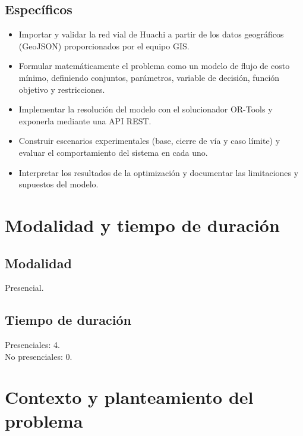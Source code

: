 \documentclass{article}
\begin{document}
\subsection{Específicos}
\begin{itemize}
    \item Importar y validar la red vial de Huachi a partir de los datos
          geográficos (GeoJSON) proporcionados por el equipo GIS.
    \item Formular matemáticamente el problema como un modelo de flujo de costo
          mínimo, definiendo conjuntos, parámetros, variable de decisión,
          función objetivo y restricciones.
    \item Implementar la resolución del modelo con el solucionador OR-Tools y
          exponerla mediante una API REST.
    \item Construir escenarios experimentales (base, cierre de vía y caso
          límite) y evaluar el comportamiento del sistema en cada uno.
    \item Interpretar los resultados de la optimización y documentar las
          limitaciones y supuestos del modelo.
\end{itemize}

\section{Modalidad y tiempo de duración}

\subsection{Modalidad}
Presencial.

\subsection{Tiempo de duración}
Presenciales: 4. \\
No presenciales: 0.

\section{Contexto y planteamiento del problema}
\end{document}
